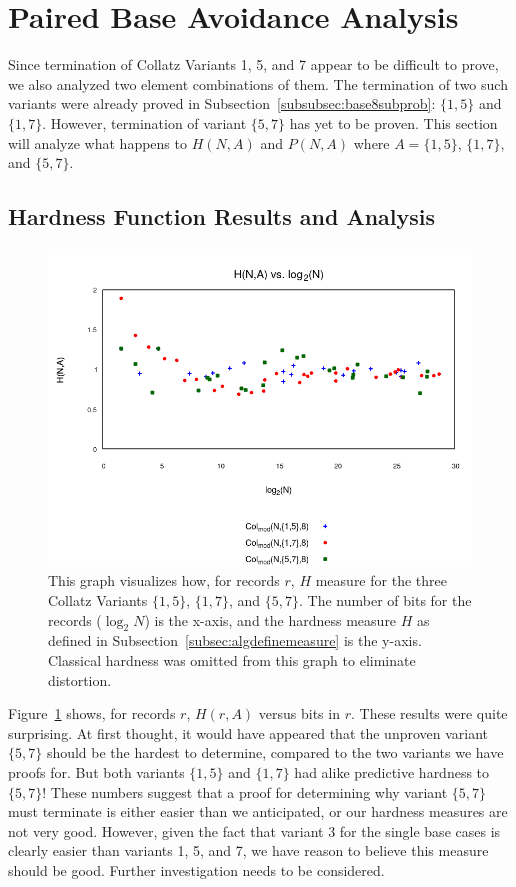 \section{Paired Base Avoidance Analysis} \label{subsec:algpairedbase}
Since termination of Collatz Variants 1, 5, and 7 appear to be difficult to prove, we also analyzed two element combinations of them. The termination of two such variants were already proved in Subsection~\ref{subsubsec:base8subprob}: $\{1,5\}$ and $\{1,7\}$. However, termination of variant $\{5,7\}$ has yet to be proven. This section will analyze what happens to $H(N,A)$ and $P(N,A)$ where $A=\{1,5\}$, $\{1,7\}$, and $\{5,7\}$.
\subsection{Hardness Function Results and Analysis} \label{subsubsec:algmulhardness}
\begin{figure}
    \centering
    \includegraphics[scale=0.6]{ModAvoidanceAnalysisPics/H_vs_log_multi_base.png}
    \caption{This graph visualizes how, for records $r$, $H$ measure for the three Collatz Variants $\{1,5\}$, $\{1,7\}$, and $\{5,7\}$. The number of bits for the records ($\log_2{N}$) is the x-axis, and the hardness measure $H$ as defined in Subsection~\ref{subsec:algdefinemeasure} is the y-axis. Classical hardness was omitted from this graph to eliminate distortion.}
    \label{fig:h_multivslog}
\end{figure}
Figure~\ref{fig:h_multivslog} shows, for records $r$, $H(r,A)$ versus bits in $r$. These results were quite surprising. At first thought, it would have appeared that the unproven variant $\{5, 7\}$ should be the hardest to determine, compared to the two variants we have proofs for. But both variants $\{1, 5\}$ and $\{1, 7\}$  had alike predictive hardness to $\{5, 7\}$! These numbers suggest that a proof for determining why variant $\{5, 7\}$ must terminate is either easier than we anticipated, or our hardness measures are not very good. However, given the fact that variant 3 for the single base cases is clearly easier than variants 1, 5, and 7, we have reason to believe this measure should be good. Further investigation needs to be considered.
